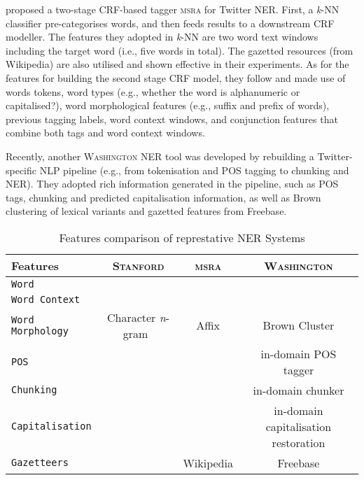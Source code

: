\documentclass[11pt]{article}
\newcommand{\eg}{e.g.,\xspace}
\newcommand{\ie}{i.e.,\xspace}
\newcommand{\ngram}{\textit{n}-gram\ }
\newcommand{\stanford}{\textsc{Stanford}\xspace}
\newcommand{\washington}{\textsc{Washington}\xspace}
\newcommand{\msra}{\textsc{msra}\xspace}
\newcommand{\feature}[1]{\texttt{#1}\xspace}
\newcommand{\cmark}{\ding{51}}%
\newcommand{\xmark}{\ding{55}}%
\begin{document}
 proposed a two-stage CRF-based tagger \msra for Twitter NER.
First, a \textit{k}-NN classifier pre-categorises words, and then feeds results to a downstream CRF modeller.
The features they adopted in \textit{k}-NN are two word text windows including the target word (\ie five words in total).
The gazetted resources (from Wikipedia) are also utilised and shown effective in their experiments.
As for the features for building the second stage CRF model, they follow  and made use of words tokens, word types (\eg whether the word is alphanumeric or capitalised?), word morphological features (\eg suffix and prefix of words), previous tagging labels, word context windows, and conjunction features that combine both tags and word context windows.

Recently, another \washington NER tool was developed by rebuilding a Twitter-specific NLP pipeline (\eg from tokenisation and POS tagging to chunking and NER).
They adopted rich information generated in the pipeline, such as POS tags, chunking and predicted capitalisation information, as well as Brown clustering of lexical variants and gazetted features from Freebase.

\begin{table*}[!htbp]
\begin{center}
\begin{tabular}{lccc}
\hline 
Features                                     & \stanford & \msra & \washington \\ 
\hline
\feature{Word}                               & \cmark & \cmark & \cmark \\
\feature{Word Context}                       & \cmark & \cmark & \cmark \\
\feature{Word Morphology}                    & Character \ngram  & Affix & Brown Cluster \\
\feature{POS}                                & \cmark & \xmark & in-domain POS tagger\\
\feature{Chunking}                           & \xmark & \xmark & in-domain chunker \\
\feature{Capitalisation}                     & \xmark & \cmark & in-domain capitalisation restoration\\
\feature{Gazetteers}                         & \xmark & Wikipedia & Freebase \\
\hline
\end{tabular}
\end{center}
\caption{Features comparison of represtative NER Systems}
\label{tab:fea_comp}
\end{table*}
\end{document}
